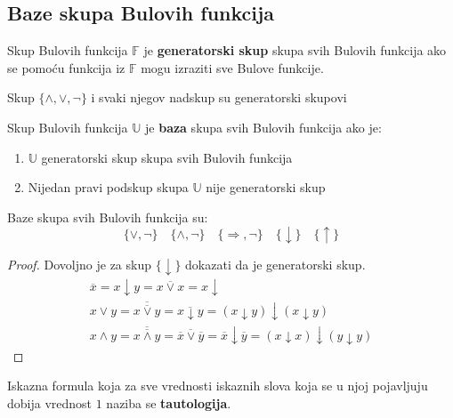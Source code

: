 \subsection{Baze skupa Bulovih funkcija}
\begin{definition}
	Skup Bulovih funkcija $\mathbb{F}$ je \textbf{generatorski skup} skupa svih Bulovih funkcija ako se pomoću funkcija iz $\mathbb{F}$ mogu izraziti sve Bulove funkcije.
\end{definition}
\begin{example}
	Skup $\{\land, \lor, \neg\}$ i svaki njegov nadskup su generatorski skupovi
\end{example}
\begin{definition}
	Skup Bulovih funkcija $\mathbb{U}$ je \textbf{baza} skupa svih Bulovih funkcija ako je:
	\begin{enumerate}[label = \arabic*)]
		\item $\mathbb{U}$ generatorski skup skupa svih Bulovih funkcija
		\item Nijedan pravi podskup skupa $\mathbb{U}$ nije generatorski skup
	\end{enumerate}
\end{definition}
\begin{example}
	Baze skupa svih Bulovih funkcija su:
	$$\{\lor, \neg\} \quad \{\land, \neg\} \quad \{\Rightarrow, \neg\} \quad \{\downarrow\} \quad \{\uparrow\}$$
\end{example}
\begin{proof}
	Dovoljno je za skup $\{ \downarrow \}$ dokazati da je generatorski skup.
	\begin{gather*}
		\overline{x} = x \downarrow y = \overline{x \lor x} = x \downarrow\\
		x \lor y = \overline{\overline{x \lor y}} = \overline{x \downarrow y} = (x \downarrow y) \downarrow (x \downarrow y)\\
		x \land y = \overline{\overline{x \land y}} = \overline{\overline{x} \lor \overline{y}} = \overline{x} \downarrow \overline{y} = (x \downarrow x) \downarrow (y \downarrow y)
	\end{gather*}
\end{proof}
\begin{definition}
	Iskazna formula koja za sve vrednosti iskaznih slova koja se u njoj pojavljuju dobija vrednost $1$ naziba se \textbf{tautologija}.
\end{definition}